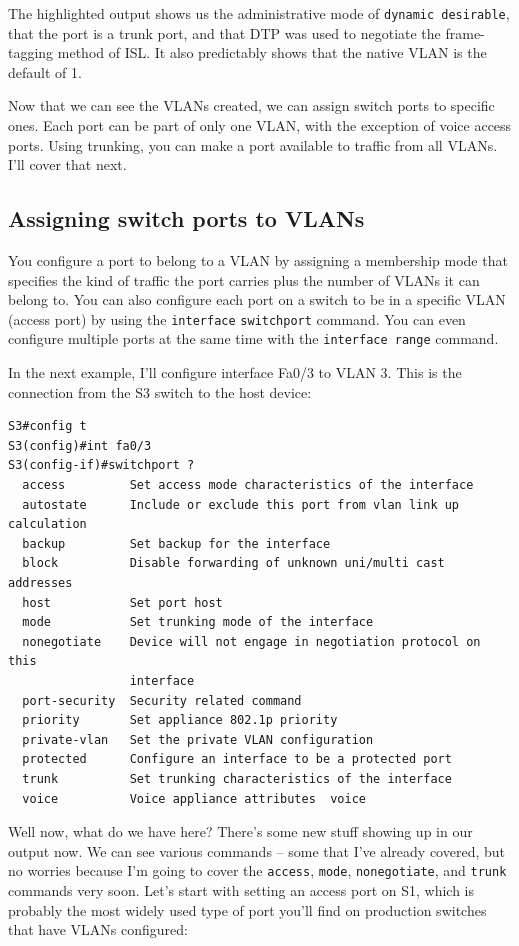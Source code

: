 The highlighted output shows us the administrative mode of
\texttt{dynamic\ desirable}, that the port is a trunk port, and that DTP
was used to negotiate the frame-tagging method of ISL. It also
predictably shows that the native VLAN is the default of 1.

Now that we can see the VLANs created, we can assign switch ports to
specific ones. Each port can be part of only one VLAN, with the
exception of voice access ports. Using trunking, you can make a port
available to traffic from all VLANs. I'll cover that next.

\subsection{Assigning switch ports to VLANs}

You configure a port to belong to a VLAN by assigning a membership mode
that specifies the kind of traffic the port carries plus the number of
VLANs it can belong to. You can also configure each port on a switch to
be in a specific VLAN (access port) by using the
\texttt{inter}\texttt{face} \texttt{switchport} command. You can even
configure multiple ports at the same time with the
\texttt{interface\ range} command.

In the next example, I'll configure interface Fa0/3 to VLAN 3. This is
the connection from the S3 switch to the host device:

\begin{verbatim}
S3#config t
S3(config)#int fa0/3
S3(config-if)#switchport ?
  access         Set access mode characteristics of the interface
  autostate      Include or exclude this port from vlan link up calculation
  backup         Set backup for the interface
  block          Disable forwarding of unknown uni/multi cast addresses
  host           Set port host
  mode           Set trunking mode of the interface
  nonegotiate    Device will not engage in negotiation protocol on this
                 interface
  port-security  Security related command
  priority       Set appliance 802.1p priority
  private-vlan   Set the private VLAN configuration
  protected      Configure an interface to be a protected port
  trunk          Set trunking characteristics of the interface
  voice          Voice appliance attributes  voice
\end{verbatim}

Well now, what do we have here? There's some new stuff showing up in our
output now. We can see various commands -- some that I've already
covered, but no worries because I'm going to cover the \texttt{access},
\texttt{mode}, \texttt{nonegotiate}, and \texttt{trunk} commands very
soon. Let's start with setting an access port on S1, which is probably
the most widely used type of port you'll find on production switches
that have VLANs configured:


